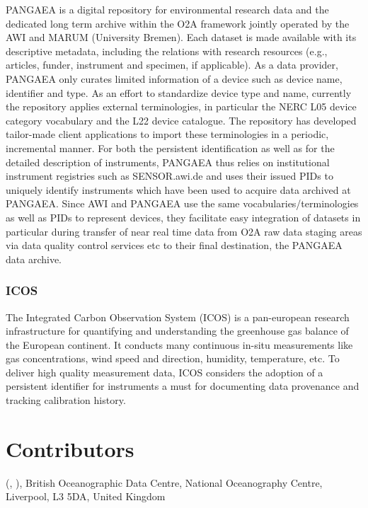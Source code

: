 \documentclass[a4paper,10pt,english]{sphinxmanual}
\begin{document}
PANGAEA is a digital repository for environmental research data and the
dedicated long term archive within the O2A framework jointly operated by
the AWI and MARUM (University Bremen). Each dataset is made available
with its descriptive metadata, including the relations with research
resources (e.g., articles, funder, instrument and specimen, if
applicable). As a data provider, PANGAEA only curates limited
information of a device such as device name, identifier and type. As an
effort to standardize device type and name, currently the repository
applies external terminologies, in particular the NERC L05 device
category vocabulary and the L22 device catalogue. The repository has
developed tailor-made client applications to import these terminologies
in a periodic, incremental manner. For both the persistent
identification as well as for the detailed description of instruments,
PANGAEA thus relies on institutional instrument registries such as
SENSOR.awi.de and uses their issued PIDs to uniquely identify
instruments which have been used to acquire data archived at PANGAEA.
Since AWI and PANGAEA use the same vocabularies/terminologies as well as
PIDs to represent devices, they facilitate easy integration of datasets
in particular during transfer of near real time data from O2A raw data
staging areas via data quality control services etc to their final
destination, the PANGAEA data archive.\sphinxfootnotemark[5]


\subsubsection{ICOS}
\label{\detokenize{white-paper/adoption:icos}}
The Integrated Carbon Observation System (ICOS) is a pan-european
research infrastructure for quantifying and understanding the greenhouse
gas balance of the European continent. It conducts many continuous
in-situ measurements like gas concentrations, wind speed and direction,
humidity, temperature, etc. To deliver high quality measurement data,
ICOS considers the adoption of a persistent identifier for instruments a
must for documenting data provenance and tracking calibration history.


\section{Contributors}
\label{\detokenize{white-paper/index:contributors}}
 (, ),
British Oceanographic Data Centre, National Oceanography Centre,
Liverpool, L3 5DA, United Kingdom
\end{document}

